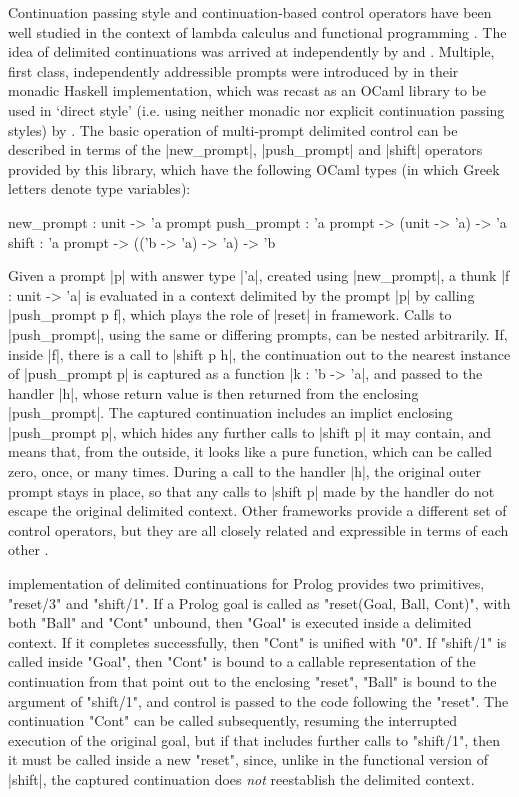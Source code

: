 Continuation passing style and continuation-based control operators have been well studied in the
context of lambda calculus and functional programming \citep{SussmanSteele1975}.
The idea of delimited continuations was arrived at independently by \cite{Felleisen1988} and
\cite{DanvyFilinski1990}. Multiple, first class, independently addressible prompts were introduced
by \cite{DyvbigJonesSabry2005} in their monadic Haskell implementation, which was recast
as an OCaml library to be used in `direct style' (i.e. using neither monadic nor explicit continuation 
passing styles) by \cite{Kiselyov2012}. The basic operation of multi-prompt delimited
control can be described in terms of the |new_prompt|, |push_prompt| and |shift| operators provided by
this library, which have the following OCaml types (in which Greek letters denote type variables):
\begin{ocamlet}
	new_prompt	: unit -> 'a prompt
	push_prompt	: 'a prompt -> (unit -> 'a) -> 'a
	shift        : 'a prompt -> (('b -> 'a) -> 'a) -> 'b
\end{ocamlet}
Given a prompt |p| with answer type |'a|, created using |new_prompt|, a thunk |f : unit -> 'a| is evaluated
in a context delimited by the prompt |p| by calling |push_prompt p f|, which plays the role of |reset| in 
 framework.
Calls to |push_prompt|, using the same or differing prompts, can be nested arbitrarily.
If, inside |f|, there is a call to |shift p h|, the
continuation out to the nearest instance of |push_prompt p| is captured as a function |k : 'b -> 'a|, and passed to the handler
|h|, whose return value is then returned from the enclosing |push_prompt|. The captured continuation includes an implict
enclosing |push_prompt p|, which hides any further calls to |shift p| it may contain, and means that, from the outside,
it looks like a pure function, which can be called zero, once, or many times. During a call to the handler |h|,
the original outer prompt stays in place, so that any calls to |shift p| made by the handler do not
escape the original delimited context. Other frameworks provide a different set of control operators, but
they are all closely related and expressible in terms of each other \citep{Shan2004}.

 implementation of delimited continuations for Prolog provides two
primitives, "reset/3" and "shift/1". If a Prolog goal is called as "reset(Goal, Ball, Cont)", with both
"Ball" and "Cont" unbound, then "Goal" is executed inside a delimited context. If it completes
successfully, then "Cont" is unified with "0".  If "shift/1" is called inside "Goal", then "Cont" is bound
to a callable representation of the continuation from that point out to the enclosing "reset", "Ball"
is bound to the argument of "shift/1", and control is passed to the code following the "reset".
The continuation "Cont" can be called subsequently, resuming the interrupted execution of the original
goal, but if that includes further calls to "shift/1", then it must be called inside a new
"reset", since, unlike in the functional version of |shift|, the captured continuation 
does \emph{not} reestablish the delimited context.

